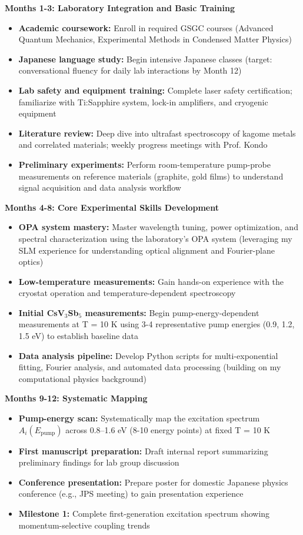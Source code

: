 \documentclass[12pt,a4paper]{article}
\begin{document}
\textbf{Months 1-3: Laboratory Integration and Basic Training}
\begin{itemize}
    \item \textbf{Academic coursework:} Enroll in required GSGC courses (Advanced Quantum Mechanics, Experimental Methods in Condensed Matter Physics)
    \item \textbf{Japanese language study:} Begin intensive Japanese classes (target: conversational fluency for daily lab interactions by Month 12)
    \item \textbf{Lab safety and equipment training:} Complete laser safety certification; familiarize with Ti:Sapphire system, lock-in amplifiers, and cryogenic equipment
    \item \textbf{Literature review:} Deep dive into ultrafast spectroscopy of kagome metals and correlated materials; weekly progress meetings with Prof. Kondo
    \item \textbf{Preliminary experiments:} Perform room-temperature pump-probe measurements on reference materials (graphite, gold films) to understand signal acquisition and data analysis workflow
\end{itemize}

\textbf{Months 4-8: Core Experimental Skills Development}
\begin{itemize}
    \item \textbf{OPA system mastery:} Master wavelength tuning, power optimization, and spectral characterization using the laboratory's OPA system (leveraging my SLM experience for understanding optical alignment and Fourier-plane optics)
    \item \textbf{Low-temperature measurements:} Gain hands-on experience with the cryostat operation and temperature-dependent spectroscopy
    \item \textbf{Initial CsV$_3$Sb$_5$ measurements:} Begin pump-energy-dependent measurements at T = 10 K using 3-4 representative pump energies (0.9, 1.2, 1.5 eV) to establish baseline data
    \item \textbf{Data analysis pipeline:} Develop Python scripts for multi-exponential fitting, Fourier analysis, and automated data processing (building on my computational physics background)
\end{itemize}

\textbf{Months 9-12: Systematic Mapping}
\begin{itemize}
    \item \textbf{Pump-energy scan:} Systematically map the excitation spectrum $A_i(E_{\text{pump}})$ across 0.8--1.6 eV (8-10 energy points) at fixed T = 10 K
    \item \textbf{First manuscript preparation:} Draft internal report summarizing preliminary findings for lab group discussion
    \item \textbf{Conference presentation:} Prepare poster for domestic Japanese physics conference (e.g., JPS meeting) to gain presentation experience
    \item \textbf{Milestone 1:} Complete first-generation excitation spectrum showing momentum-selective coupling trends
\end{itemize}
\end{document}
